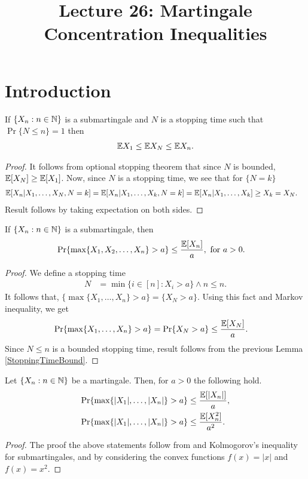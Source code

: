 \documentclass[a4paper,10pt,english]{article}
\title{Lecture 26: Martingale Concentration Inequalities}
\author{}
\begin{document}
\maketitle
\section{Introduction}

\begin{lem}
\label{StoppingTimeBound}
If $\{X_n: n \in \mathbb{N} \}$ is  a submartingale and $N$ is a stopping time such that $\Pr\{N \leq n\}=1$ then
\begin{align*}
 \mathbb{E} X_1 \leq \mathbb{E} X_N \leq \mathbb{E} X_n.
\end{align*}
\end{lem}
\begin{proof}
It follows from optional stopping theorem that since $N$ is bounded, $\mathbb{E}[X_N] \geq \mathbb{E}[X_1]$. 
Now, since $N$ is a stopping time, we see that for $\{N = k\}$
\begin{align*}
\mathbb{E}[X_n|X_1, \ldots, X_N, N = k ]&= \mathbb{E}[X_n|X_1, \ldots, X_k, N=k] = \mathbb{E}[X_n|X_1, \ldots, X_k] \geq X_k = X_N.
\end{align*}
Result follows by taking expectation on both sides.
\end{proof}

\begin{thm} If $\{X_n: n \in \mathbb{N} \}$ is a submartingale, then
\begin{align*}
\Pr\{\max\{X_1,X_2, \ldots, X_n\}>a\} &\leq \frac{\mathbb{E}[X_n]}{a},\text{ for } a>0.
\end{align*}
\end{thm}
\begin{proof}
We define a stopping time 
\begin{align*}
N &= \min\{i \in [n]: X_i >a\} \wedge n \leq n.
\end{align*} %
It follows that, $\{\max\{X_1, \ldots, X_n\}>a\} = \{X_N > a\}$. 
Using this fact and Markov inequality, we get
\begin{align*}
\Pr\{\max\{X_1, \ldots, X_n\}>a\} &=\Pr\{X_N>a\} \leq \frac{\mathbb{E}[X_N]}{a}.
\end{align*}
Since $N \leq n$ is a bounded stopping time, result follows from the previous Lemma \ref{StoppingTimeBound}.
\end{proof}
\begin{cor}
\label{MartingaleBoundCor}
Let $\{X_n : n \in \mathbb{N} \}$ be a martingale. Then, for $a>0$ the following hold.
\begin{align*}
\Pr\{\max\{|X_1|, \ldots, |X_n|\}>a\} &\leq \frac{\mathbb{E}[|X_n|]}{a},\\
\Pr\{\max\{|X_1|, \ldots, |X_n|\}>a\} &\leq \frac{\mathbb{E}[X_n^2]}{a^2}.
\end{align*}
\end{cor}
\begin{proof}
The proof the above statements follow from and Kolmogorov's inequality for submartingales, and by considering the convex functions $f(x)=|x|$ and $f(x)=x^2$. 
\end{proof}
\end{document}
